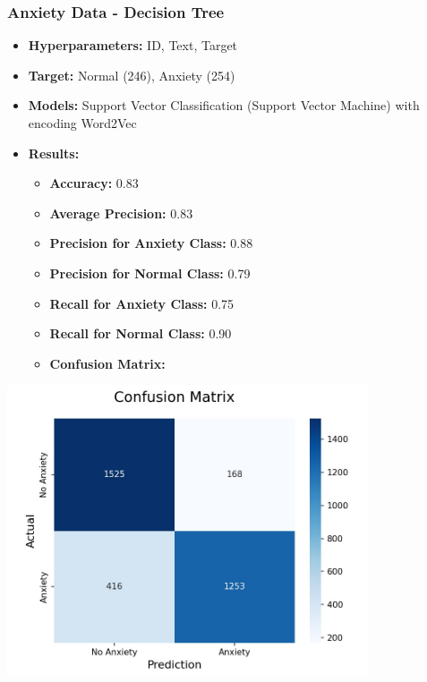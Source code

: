 \documentclass[a4paper,12pt]{article}
\begin{document}
\vspace{0.5cm} %

\subsubsection{Anxiety Data - Decision Tree}

\begin{itemize}
    \item \textbf{Hyperparameters:} ID, Text, Target
    \item \textbf{Target:} Normal (246), Anxiety (254)
    \item \textbf{Models:} Support Vector Classification (Support Vector Machine) with encoding Word2Vec
    \item \textbf{Results:}
    \begin{itemize}
        \item \textbf{Accuracy:} 0.83
        \item \textbf{Average Precision:} 0.83
        \item \textbf{Precision for Anxiety Class:} 0.88
        \item \textbf{Precision for Normal Class:} 0.79
        \item \textbf{Recall for Anxiety Class:} 0.75
        \item \textbf{Recall for Normal Class:} 0.90
        \item \textbf{Confusion Matrix:}
    \end{itemize}
\end{itemize}

\begin{center}
    \includegraphics[width=0.8\textwidth]{Anxiety-Data-DecisionTree.jpg} %
\end{center}
\end{document}
